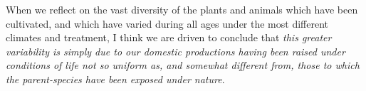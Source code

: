 When we reflect on the vast diversity of the plants and animals which have been cultivated, and which have varied during all ages under the most different climates and treatment, I think we are driven to conclude that \textit{this greater variability is simply due to our domestic productions having been raised under conditions of life not so uniform as, and somewhat different from, those to which the parent-species have been exposed under nature}.